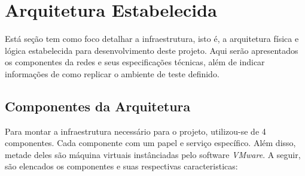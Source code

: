 \chapter{Arquitetura Estabelecida}
\label{chap:Arquitetura}

	Está seção tem como foco detalhar a infraestrutura, isto é, a arquitetura física e lógica estabelecida para desenvolvimento deste projeto. Aqui serão apresentados os componentes da redes e seus especificações técnicas, além de indicar informações de como replicar o ambiente de teste definido.

	\section{Componentes da Arquitetura}
	\label{sec:Arquitetura_Componentes}

		Para montar a infraestrutura necessário para o projeto, utilizou-se de 4 componentes. Cada componente com um papel e serviço específico. Além disso, metade deles são máquina virtuais instânciadas pelo software \emph{VMware}. A seguir, são elencados os componentes e suas respectivas caracteristicas:

